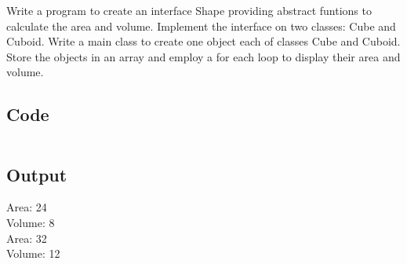 \documentclass[../main.tex]{subfiles}
\begin{document}
Write a program to create an interface Shape providing abstract funtions to
calculate the area and volume. Implement the interface on two classes: Cube and
Cuboid. Write a main class to create one object each of classes Cube and
Cuboid. Store the objects in an array and employ a for each loop to display
their area and volume.

\subsection{Code}
\inputminted[frame=lines, breaklines, breakanywhere, numberblanklines=false]{java}{./programs/prog8/Interface.java}

\subsection{Output}
Area: 24 \\
Volume: 8 \\
Area: 32 \\
Volume: 12 \\
\end{document}
